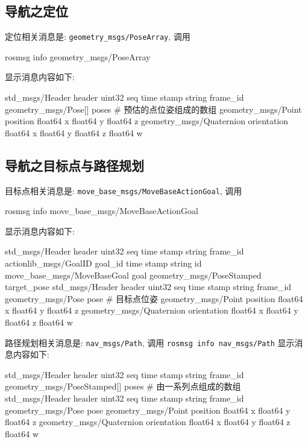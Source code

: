 \documentclass[openany, fontset=windowsold]{ctexbook}
\theoremstyle{kaiti}
\theoremstyle{normal}
\begin{document}
\subsection{导航之定位}

定位相关消息是: \verb|geometry_msgs/PoseArray|, 调用 

\begin{bash}
  rosmsg info geometry_msgs/PoseArray
\end{bash}

显示消息内容如下:

\begin{bash}
  std_msgs/Header header
    uint32 seq
    time stamp
    string frame_id
  geometry_msgs/Pose[] poses # 预估的点位姿组成的数组
    geometry_msgs/Point position
      float64 x
      float64 y
      float64 z
    geometry_msgs/Quaternion orientation
      float64 x
      float64 y
      float64 z
      float64 w
\end{bash}

\subsection{导航之目标点与路径规划}

目标点相关消息是: \verb|move_base_msgs/MoveBaseActionGoal|, 调用 

\begin{bash}
  rosmsg info move_base_msgs/MoveBaseActionGoal
\end{bash}

显示消息内容如下:

\begin{bash}
  std_msgs/Header header
    uint32 seq
    time stamp
    string frame_id
  actionlib_msgs/GoalID goal_id
    time stamp
    string id
  move_base_msgs/MoveBaseGoal goal
    geometry_msgs/PoseStamped target_pose
      std_msgs/Header header
        uint32 seq
        time stamp
        string frame_id
      geometry_msgs/Pose pose # 目标点位姿
        geometry_msgs/Point position
          float64 x
          float64 y
          float64 z
        geometry_msgs/Quaternion orientation
          float64 x
          float64 y
          float64 z
          float64 w
\end{bash}

路径规划相关消息是: \verb|nav_msgs/Path|, 调用 \verb|rosmsg info nav_msgs/Path| 显示消息内容如下:

\begin{bash}
  std_msgs/Header header
    uint32 seq
    time stamp
    string frame_id
  geometry_msgs/PoseStamped[] poses # 由一系列点组成的数组
    std_msgs/Header header
      uint32 seq
      time stamp
      string frame_id
    geometry_msgs/Pose pose
      geometry_msgs/Point position
        float64 x
        float64 y
        float64 z
      geometry_msgs/Quaternion orientation
        float64 x
        float64 y
        float64 z
        float64 w
\end{bash}
\end{document}
